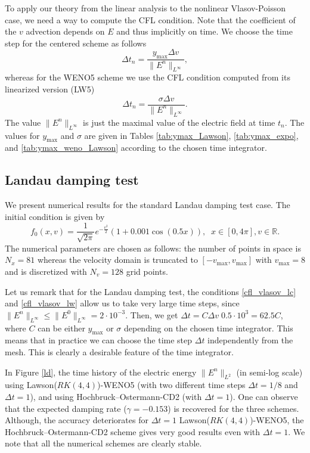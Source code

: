 To apply our theory from the linear analysis to the nonlinear Vlasov-Poisson case, we need a way to compute the CFL condition. Note that the coefficient of the $v$ advection depends on $E$ and thus implicitly on time. We choose the time step for the centered scheme as follows
\begin{equation}
  \label{cfl_vlasov_lc}
  \Delta t_n = \frac{y_{\max} \Delta v}{\| E^n \|_{L^\infty}}, 
\end{equation}
whereas for the WENO5 scheme we use the CFL condition computed from its linearized version (LW5)
\begin{equation}
  \label{cfl_vlasov_lw}
  \Delta t_n = \frac{\sigma \Delta v}{\| E^n \|_{L^\infty}}.
\end{equation}
The value $\| E^n \|_{L^\infty}$ is just the maximal value of the electric field at time $t_n$. The values for  $y_{\max}$ and $\sigma$ are given in Tables \ref{tab:ymax_Lawson}, \ref{tab:ymax_expo}, and \ref{tab:ymax_weno_Lawson} according to the chosen time integrator. 



\subsection{Landau damping test}

We present numerical results for the standard Landau damping test case. The initial condition is given by
$$
  f_0(x, v) = \frac{1}{\sqrt{2\pi}} e^{-\frac{v^2}{2}} (1+0.001 \cos(0.5 x)), \;\; x\in [0, 4\pi], v\in \mathbb{R}. 
$$
The numerical parameters are chosen as follows: the number of points in space is $N_x=81$ whereas the velocity domain is truncated to $[-v_{\max}, v_{\max}]$ with $v_{\max}=8$ and is discretized with $N_v=128$ grid points.

Let us remark that for the Landau damping test, the conditions \eqref{cfl_vlasov_lc} and \eqref{cfl_vlasov_lw} allow us to take very large time steps, since $\| E^n \|_{L^\infty} \leq \| E^0 \|_{L^\infty} = 2\cdot 10^{-3}$. Then, we get $\Delta t = C \Delta v \; 0.5\cdot 10^3 =  62.5 C$, where $C$ can be either $y_{\max}$ or $\sigma$ depending on the chosen time integrator. This means that in practice we can choose the time step $\Delta t$ independently from the mesh. This is clearly a desirable feature of the time integrator.

In Figure \ref{ld}, the time history of the electric energy $\|E^n\|_{L^2}$ (in semi-log scale) using Lawson($RK(4, 4)$)-WENO5 (with two different time steps $\Delta t=1/8$ and $\Delta t=1$), and using Hochbruck--Ostermann-CD2 (with $\Delta t=1$). One can observe that the expected damping rate ($\gamma=-0.153$) is recovered for the three schemes. Although, the accuracy deteriorates for $\Delta t=1$ Lawson($RK(4, 4)$)-WENO5, the Hochbruck--Ostermann-CD2 scheme gives very good results even with $\Delta t=1$. We note that all the numerical schemes are clearly stable.


